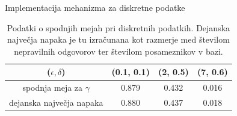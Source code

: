 \documentclass{beamer}
\begin{document}
\begin{frame}{Implementacija mehanizma za diskretne podatke}
\begin{table}[!htb]
\begin{center}
 \begin{tabular}{| c | c | c | c|} 
 \hline
($\epsilon, \delta$) & (0.1, 0.1) & (2, 0.5) & (7, 0.6)  \\ [0.5ex] 
 \hline
 spodnja meja za  $\gamma$ & 0.879 & 0.432 & 0.016  \\ 
 \hline
 dejanska največja napaka & 0.880 & 0.437 & 0.018\\
 \hline
\end{tabular}
\caption{Podatki o spodnjih mejah pri diskretnih podatkih. Dejanska največja napaka je tu izračunana kot razmerje med številom nepravilnih odgovorov ter številom posameznikov v bazi. }
\end{center}
\end{table}
\end{frame}




















%
%    
%    
%
%    
%
\end{document}
